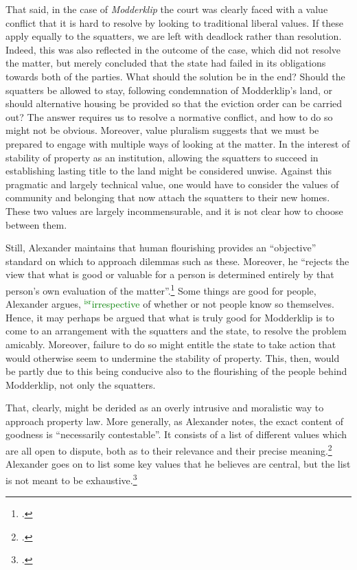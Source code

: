 \documentclass[12pt,a4paper]{book} %
\newcommand{\isr}[1]{\textcolor{green}{$^{\textrm{isr}}${#1}}}
\begin{document}
That said, in the case of {\it Modderklip} the court was clearly faced with a value conflict that it is hard to resolve by looking to traditional liberal values. If these apply equally to the squatters, we are left with deadlock rather than resolution. Indeed, this was also reflected in the outcome of the case, which did not resolve the matter, but merely concluded that the state had failed in its obligations towards both of the parties. What should the solution be in the end? Should the squatters be allowed to stay, following condemnation of Modderklip's land, or should alternative housing be provided so that the eviction order can be carried out? The answer requires us to resolve a normative conflict, and how to do so might not be obvious. Moreover, value pluralism suggests that we must be prepared to engage with multiple ways of looking at the matter. In the interest of stability of property as an institution, allowing the squatters to succeed in establishing lasting title to the land might be considered unwise. Against this pragmatic and largely technical value, one would have to consider the values of community and belonging that now attach the squatters to their new homes. These two values are largely incommensurable, and it is not clear how to choose between them.

Still, Alexander maintains that human flourishing provides an ``objective'' standard on which to approach dilemmas such as these. Moreover, he ``rejects the view that what is good or valuable for a person is determined entirely by that person's own evaluation of the matter''.\footcite[1263]{alexander14} Some things are good for people, Alexander argues, \isr{irrespective} of whether or not people know so themselves. Hence, it may perhaps be argued that what is truly good for Modderklip is to come to an arrangement with the squatters and the state, to resolve the problem amicably. Moreover, failure to do so might entitle the state to take action that would otherwise seem to undermine the stability of property. This, then, would be partly due to this being conducive also to the flourishing of the people behind Modderklip, not only the squatters.

That, clearly, might be derided as an overly intrusive and moralistic way to approach property law. More generally, as Alexander notes, the exact content of goodness is ``necessarily contestable''. It consists of a list of different values which are all open to dispute, both as to their relevance and their precise meaning.\footcite[1263]{alexander14} Alexander goes on to list some key values that he believes are central, but the list is not meant to be exhaustive.\footcite[1764-1776]{alexander14}
\end{document}
